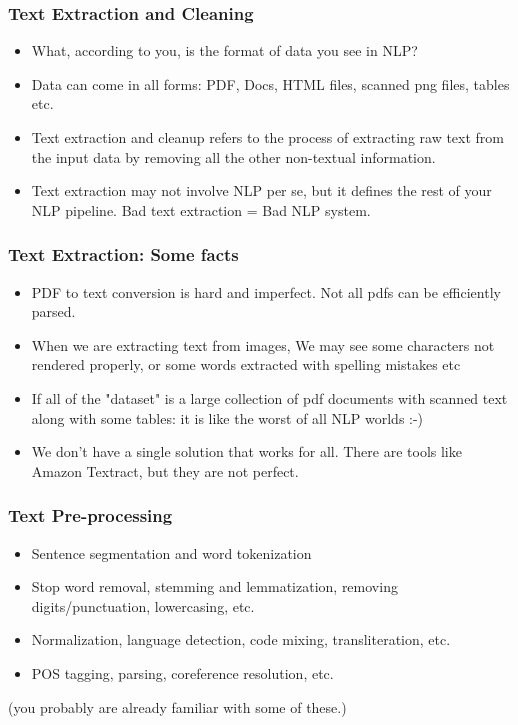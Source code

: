 \documentclass{beamer}
\begin{document}
\begin{frame}
\frametitle{Text Extraction and Cleaning}
\begin{itemize}
    \item What, according to you, is the format of data you see in NLP? \pause
    \item Data can come in all forms: PDF, Docs, HTML files, scanned png files, tables etc.
     \item Text extraction and cleanup refers to the process of extracting raw text from the input data by removing all the other non-textual information.
     \item Text extraction may not involve NLP per se, but it defines the rest of your NLP pipeline. Bad text extraction = Bad NLP system.
\end{itemize}
\end{frame}

\begin{frame}
\frametitle{Text Extraction: Some facts}
\begin{itemize}
    \item PDF to text conversion is hard and imperfect. Not all pdfs can be efficiently parsed. \pause
    \item When we are extracting text from images, We may see some characters not rendered properly, or some words extracted with spelling mistakes etc
    \item If all of the "dataset" is a large collection of pdf documents with scanned text along with some tables: it is like the worst of all NLP worlds  :-) 
    \item We don't have a single solution that works for all. There are tools like Amazon Textract, but they are not perfect. 
\end{itemize}
\end{frame}

\begin{frame}
\frametitle{Text Pre-processing}
\begin{itemize}
    \item Sentence segmentation and word tokenization \pause
    \item Stop word removal, stemming and lemmatization, removing digits/punctuation, lowercasing, etc. \pause
    \item Normalization, language detection, code mixing, transliteration, etc. \pause
    \item POS tagging, parsing, coreference resolution, etc.
\end{itemize}
(you probably are already familiar with some of these.)
\end{frame}
\end{document}
